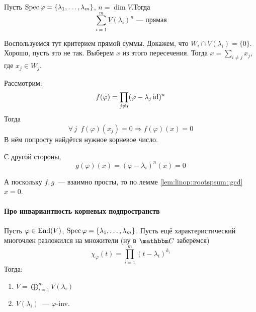 \documentclass[12pt]{../../../notes}
\begin{document}
\begin{thrm}\label{thrm:linop::rootspsum}
  Пусть $\operatorname{Spec} \varphi = \{\lambda_1, \dotsc , \lambda_m\}$, $n = \dim V$.Тогда 
  \[
    \sum_{i=1}^{m} V(\lambda_i)^n\text{~--- прямая}
  \]
\end{thrm}
\begin{ittproof}
  Воспользуемся тут критерием прямой суммы. Докажем, что $W_i \cap V(\lambda_i) = \{0\}$.
  Хорошо, пусть это не так. Выберем $x$ из этого пересечения. Тогда $x= \sum_{i\neq j} x_j$,
  где $x_j \in W_j$.

  Рассмотрим:
  \begin{align*}
    f(\varphi) = \prod_{j\neq i} (\varphi -\lambda_j \operatorname{id})^n
  \end{align*}
  Тогда 
  \[
    \forall\, j \;\: f(\varphi)(x_j) = 0 \Rightarrow f(\varphi)(x) = 0
  \]
  В нём попросту найдётся нужное корневое число. 
  
  С другой стороны, \[
    g(\varphi)(x) = (\varphi - \lambda_i)^n(x) = 0
  \]

  А поскольку $f, g$~--- взаимно просты, то по лемме \ref{lem:linop::rootspsum::gcd} $x=0$.
\end{ittproof}
\newpage
{}
\newpage
\paragraph{Про инвариантность корневых подпространств}
\begin{thrm}\label{thrm:linop::rootspinv}
  Пусть $\varphi \in \operatorname{End} (V)$, $\operatorname{Spec} \varphi = \{\lambda_1, \dotsc , \lambda_m\}$.
  Пусть ещё характеристический многочлен разложился на множители (ну в $\C$ заберёмся)
  \[
    \chi_\varphi(t) = \prod_{i=1}^m (t-\lambda_i)^{k_i}
  \]
  Тогда:
  \begin{enumerate}
    \item $\displaystyle V = \bigoplus\limits_{i=1}^m V(\lambda_i)$
    \item $\displaystyle V(\lambda_i)$~--- $\varphi$-inv.
  \end{enumerate}
\end{thrm}
\end{document}
